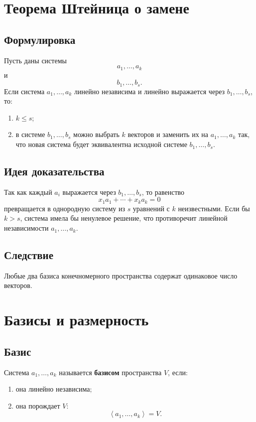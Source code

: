 \documentclass[12pt,a4paper]{article}
\newcommand{\Lin}[1]{\left\langle #1 \right\rangle}
\begin{document}
\section{Теорема Штейница о замене}

\subsection*{Формулировка}

Пусть даны системы
\[
    a_1,\ldots,a_k
\]
и
\[
    b_1,\ldots,b_s.
\]
Если система $a_1,\ldots,a_k$ линейно независима и линейно выражается через $b_1,\ldots,b_s$, то:
\begin{enumerate}
    \item $k\le s$;
    \item в системе $b_1,\ldots,b_s$ можно выбрать $k$ векторов и заменить их на $a_1,\ldots,a_k$ так, что новая система будет эквивалентна исходной системе $b_1,\ldots,b_s$.
\end{enumerate}

\subsection*{Идея доказательства}

Так как каждый $a_i$ выражается через $b_1,\ldots,b_s$, то равенство
\[
    x_1a_1+\cdots+x_ka_k=0
\]
превращается в однородную систему из $s$ уравнений с $k$ неизвестными. Если бы $k>s$, система имела бы ненулевое решение, что противоречит линейной независимости $a_1,\ldots,a_k$.

\subsection*{Следствие}

Любые два базиса конечномерного пространства содержат одинаковое число векторов.

\section{Базисы и размерность}

\subsection*{Базис}

Система $a_1,\ldots,a_k$ называется \textbf{базисом} пространства $V$, если:
\begin{enumerate}
    \item она линейно независима;
    \item она порождает $V$:
    \[
        \Lin{a_1,\ldots,a_k}=V.
    \]
\end{enumerate}
\end{document}
